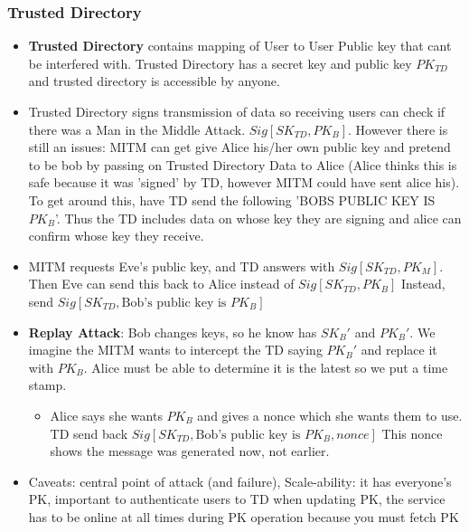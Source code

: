 \documentclass{article}
\begin{document}
\subsubsection{Trusted Directory}
\begin{itemize}
\item \textbf{Trusted Directory} contains mapping of User to User Public key that cant be interfered with. Trusted Directory has a secret key and public key $PK_{TD}$ and trusted directory is accessible by anyone. 
\item Trusted Directory signs transmission of data so receiving users can check if there was a Man in the Middle Attack. $Sig[SK_{TD}, PK_B]$. However there is still an issues: MITM can get give Alice his/her own public key and pretend to be bob by passing on Trusted Directory Data to Alice (Alice thinks this is safe because it was 'signed' by TD, however MITM could have sent alice his). To get around this, have TD send the following 'BOBS PUBLIC KEY IS $PK_B$'. Thus the TD includes data on whose key they are signing and alice can confirm whose key they receive.
\item MITM requests Eve's public key, and TD answers with $Sig[SK_{TD}, PK_M]$. Then Eve can send this back to Alice instead of $Sig[SK_{TD}, PK_B]$ Instead, send $Sig[SK_{TD}, \textrm{Bob's public key is } PK_B]$
\item \textbf{Replay Attack}: Bob changes keys, so he know has $SK_B'$ and $PK_B'$. We imagine the MITM wants to intercept the TD saying $PK_B'$ and replace it with $PK_B$. Alice must be able to determine it is the latest so we put a time stamp. 
\begin{itemize}
\item Alice says she wants $PK_B$ and gives a nonce which she wants them to use. TD send back $Sig[SK_{TD}, \textrm{Bob's public key is } PK_B, nonce]$ This nonce shows the message was generated now, not earlier.
\end{itemize} 
\item Caveats: central point of attack (and failure), Scale-ability: it has everyone's PK, important to authenticate users to TD when updating PK, the service has to be online at all times during PK operation because you must fetch PK
\end{itemize}
\end{document}
